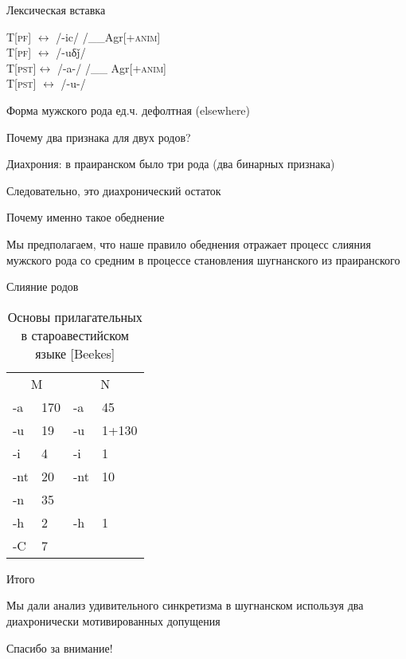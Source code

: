 \documentclass[xcolor=table]{beamer}
\begin{document}
\begin{frame}{Лексическая вставка}

	\pex
		\a T[\textsc{pf}] $\leftrightarrow$ /-ic/ /\_\_Agr[+\textsc{anim}]\\
		\a T[\textsc{pf}] $\leftrightarrow$ /-uδǰ/\\
		\a T[\textsc{pst}]$\leftrightarrow$ /-a-/ /\_\_ Agr[+\textsc{anim}]\\
		\a T[\textsc{pst}] $\leftrightarrow$ /-u-/
	\xe

	Форма мужского рода ед.ч. дефолтная (elsewhere)

\end{frame}

\begin{frame}{Почему два признака для двух родов?}

	Диахрония: в праиранском было три рода (два бинарных признака)

	Следовательно, это диахронический остаток
\end{frame}

\begin{frame}{Почему именно такое обеднение}

	Мы предполагаем, что наше правило обеднения отражает процесс слияния мужского рода со средним в процессе становления шугнанского из праиранского

\end{frame}

\begin{frame}{Слияние родов}

	\begin{table}[]
\centering
\caption{Основы прилагательных в староавестийском языке [Beekes]}
\label{tab:my-table}
\begin{tabular}{llll}
\multicolumn{2}{c}{M}            & \multicolumn{2}{c}{N} \\
-a & 170 & -a       & 45         \\
-u & 19  & -u       & 1+130      \\
-i  & 4  & -i  & 1  \\
-nt & 20 & -nt & 10 \\
-n  & 35 &     &    \\
-h  & 2  & -h  & 1  \\
-C  & 7  &     &   
\end{tabular}
\end{table}

\end{frame}


\begin{frame}{Итого}

 Мы дали анализ удивительного синкретизма в шугнанском используя два диахронически мотивированных допущения
	
	Спасибо за внимание!
\end{frame}
\end{document}
